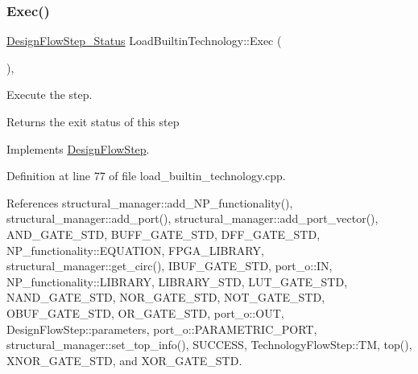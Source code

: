 \subsubsection{\texorpdfstring{Exec()}{Exec()}}
{\footnotesize\ttfamily \hyperlink{design__flow__step_8hpp_afb1f0d73069c26076b8d31dbc8ebecdf}{Design\+Flow\+Step\+\_\+\+Status} Load\+Builtin\+Technology\+::\+Exec (\begin{DoxyParamCaption}{ }\end{DoxyParamCaption})\hspace{0.3cm}{\ttfamily [override]}, {\ttfamily [virtual]}}



Execute the step. 

\begin{DoxyReturn}{Returns}
the exit status of this step 
\end{DoxyReturn}


Implements \hyperlink{classDesignFlowStep_a77d7e38493016766098711ea24f60b89}{Design\+Flow\+Step}.



Definition at line 77 of file load\+\_\+builtin\+\_\+technology.\+cpp.



References structural\+\_\+manager\+::add\+\_\+\+N\+P\+\_\+functionality(), structural\+\_\+manager\+::add\+\_\+port(), structural\+\_\+manager\+::add\+\_\+port\+\_\+vector(), A\+N\+D\+\_\+\+G\+A\+T\+E\+\_\+\+S\+TD, B\+U\+F\+F\+\_\+\+G\+A\+T\+E\+\_\+\+S\+TD, D\+F\+F\+\_\+\+G\+A\+T\+E\+\_\+\+S\+TD, N\+P\+\_\+functionality\+::\+E\+Q\+U\+A\+T\+I\+ON, F\+P\+G\+A\+\_\+\+L\+I\+B\+R\+A\+RY, structural\+\_\+manager\+::get\+\_\+circ(), I\+B\+U\+F\+\_\+\+G\+A\+T\+E\+\_\+\+S\+TD, port\+\_\+o\+::\+IN, N\+P\+\_\+functionality\+::\+L\+I\+B\+R\+A\+RY, L\+I\+B\+R\+A\+R\+Y\+\_\+\+S\+TD, L\+U\+T\+\_\+\+G\+A\+T\+E\+\_\+\+S\+TD, N\+A\+N\+D\+\_\+\+G\+A\+T\+E\+\_\+\+S\+TD, N\+O\+R\+\_\+\+G\+A\+T\+E\+\_\+\+S\+TD, N\+O\+T\+\_\+\+G\+A\+T\+E\+\_\+\+S\+TD, O\+B\+U\+F\+\_\+\+G\+A\+T\+E\+\_\+\+S\+TD, O\+R\+\_\+\+G\+A\+T\+E\+\_\+\+S\+TD, port\+\_\+o\+::\+O\+UT, Design\+Flow\+Step\+::parameters, port\+\_\+o\+::\+P\+A\+R\+A\+M\+E\+T\+R\+I\+C\+\_\+\+P\+O\+RT, structural\+\_\+manager\+::set\+\_\+top\+\_\+info(), S\+U\+C\+C\+E\+SS, Technology\+Flow\+Step\+::\+TM, top(), X\+N\+O\+R\+\_\+\+G\+A\+T\+E\+\_\+\+S\+TD, and X\+O\+R\+\_\+\+G\+A\+T\+E\+\_\+\+S\+TD.


